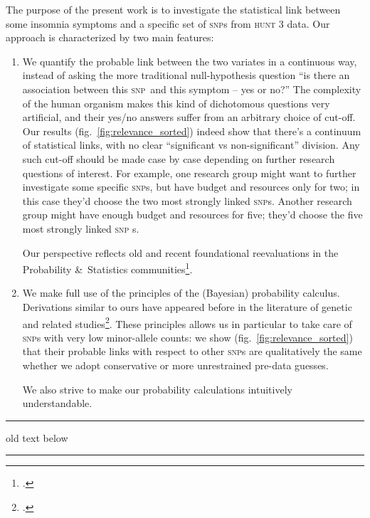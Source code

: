 \documentclass[\ifafour a4paper,12pt,\else a5paper,10pt,\fi%
onecolumn,oneside,article,%
british%
]{memoir}
\theoremstyle{remark}
\theoremstyle{innote}
\newcommand*{\citep}{\footcites}
\newcommand*{\amp}{\&}
\renewcommand*{\|}[1][]{\nonscript\,#1\vert\nonscript\;\mathopen{}}
\newcommand*{\fig}{fig.}%
\newcommand*{\snp}{\textsc{snp}}
\begin{document}
The purpose of the present work is to investigate the statistical link
between some insomnia symptoms and a specific set of \snp s from
\textsc{hunt} 3 data. Our approach is characterized by two main features:
\begin{enumerate}[wide]
\item We quantify the probable link between the two variates in a
  continuous way, instead of asking the more traditional null-hypothesis
  question \enquote{is there an association between this \snp\ and this
    symptom -- yes or no?} The complexity of the human organism makes this
  kind of dichotomous questions very artificial, and their yes/no answers
  suffer from an arbitrary choice of cut-off. Our results
  (\fig~\ref{fig:relevance_sorted}) indeed show that there's a continuum of
  statistical links, with no clear \enquote{significant vs non-significant}
  division. Any such cut-off should be made case by case depending on
  further research questions of interest. For example, one research group
  might want to further investigate some specific \snp s, but have budget
  and resources only for two; in this case they'd choose the two most
  strongly linked \snp s. Another research group might have enough budget
  and resources for five; they'd choose the five most strongly linked \snp
  s.

  Our perspective reflects old and recent foundational reevaluations in the
  Probability \amp\ Statistics
  communities\citep{asa2016,asa2019,amrheinetal2019}[see
  also][]{bergeretal1988,bergeretal1987b,johnson1999}[Box~3
  p.~687]{stephensetal2003}.

\item We make full use of the principles of the (Bayesian) probability
  calculus. Derivations similar to ours have appeared before in the
  literature of genetic and related
  studies\citep{lange1995,lange1997_r2003,lewingeretal2007,stingoetal2015}[see
  also refs in][]{stephensetal2009}. These principles allows us in
  particular to take care of \snp s with very low minor-allele counts: we
  show (\fig~\ref{fig:relevance_sorted}) that their probable links with
  respect to other \snp s are qualitatively the same whether we adopt
  conservative or more unrestrained pre-data guesses.

  We also strive to make our probability calculations intuitively
  understandable.
\end{enumerate}






\clearpage
\hrule
old text below
\hrule
\end{document}

